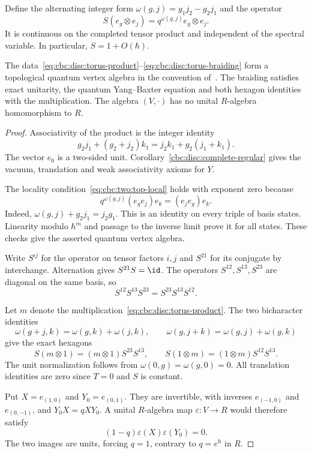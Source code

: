 Define the alternating integer form
$\omega(g,j)=g_1j_2-g_2j_1$ and the operator
\begin{equation}\label{eq:cbc:disc:torus-braiding}
 S(e_g\otimes e_j)=q^{\omega(g,j)}e_g\otimes e_j.
\end{equation}
It is continuous on the completed tensor product and independent of the spectral variable.
In particular, $S=1+O(\hbar)$.

\begin{proposition}\label{cbc:disc:torus}
The data~\eqref{eq:cbc:disc:torus-product}--\eqref{eq:cbc:disc:torus-braiding} form a topological quantum vertex algebra in the convention of~\cite[Definitions 3.5 and 3.12]{DSGKQVA}.
The braiding satisfies exact unitarity, the quantum Yang--Baxter equation and both hexagon identities with the multiplication.
The algebra $(V,\cdot)$ has no unital $R$-algebra homomorphism to $R$.
\end{proposition}
\begin{proof}
Associativity of the product is the integer identity
\[
 g_2j_1+(g_2+j_2)k_1
       =j_2k_1+g_2(j_1+k_1).
\]
The vector $e_0$ is a two-sided unit.
Corollary~\ref{cbc:disc:complete-regular} gives the vacuum, translation and weak associativity axioms for $Y$.

The locality condition~\eqref{eq:cbc:two:top-local} holds with exponent zero because
\[
 q^{\omega(g,j)}(e_g e_j)e_k=(e_j e_g)e_k.
\]
Indeed, $\omega(g,j)+g_2j_1=j_2g_1$.
This is an identity on every triple of basis states.
Linearity modulo $\hbar^m$ and passage to the inverse limit prove it for all states.
These checks give the asserted quantum vertex algebra.

Write $S^{ij}$ for the operator on tensor factors $i,j$ and $S^{21}$ for its conjugate by interchange.
Alternation gives $S^{21}S=\id$.
The operators $S^{12},S^{13},S^{23}$ are diagonal on the same basis, so
\[
 S^{12}S^{13}S^{23}=S^{23}S^{13}S^{12}.
\]

Let $m$ denote the multiplication~\eqref{eq:cbc:disc:torus-product}.
The two bicharacter identities
\[
 \omega(g+j,k)=\omega(g,k)+\omega(j,k),\qquad
 \omega(g,j+k)=\omega(g,j)+\omega(g,k)
\]
give the exact hexagons
\[
 S(m\otimes1)=(m\otimes1)S^{23}S^{13},\qquad
 S(1\otimes m)=(1\otimes m)S^{12}S^{13}.
\]
The unit normalization follows from $\omega(0,g)=\omega(g,0)=0$.
All translation identities are zero since $T=0$ and $S$ is constant.

Put $X=e_{(1,0)}$ and $Y_0=e_{(0,1)}$.
They are invertible, with inverses $e_{(-1,0)}$ and $e_{(0,-1)}$, and
$Y_0X=qXY_0$.
A unital $R$-algebra map $\varepsilon:V\to R$ would therefore satisfy
\[
 (1-q)\varepsilon(X)\varepsilon(Y_0)=0.
\]
The two images are units, forcing $q=1$, contrary to $q=e^\hbar$ in $R$.
\end{proof}

